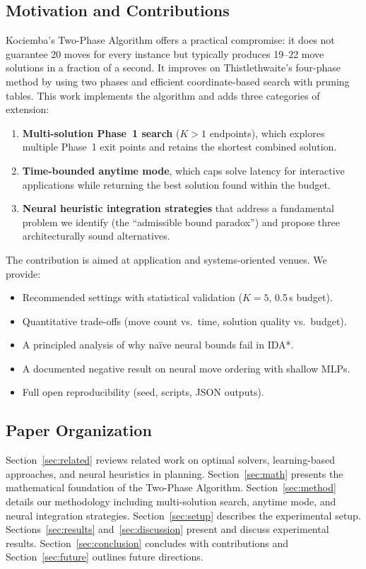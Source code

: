 \documentclass[10pt,twocolumn,a4paper]{article}
\begin{document}
\subsection{Motivation and Contributions}
Kociemba's Two-Phase Algorithm offers a practical compromise: it does not guarantee 20 moves for every instance but typically produces 19--22 move solutions in a fraction of a second. It improves on Thistlethwaite's four-phase method by using two phases and efficient coordinate-based search with pruning tables. This work implements the algorithm and adds three categories of extension:

\begin{enumerate}[leftmargin=*]
  \item \textbf{Multi-solution Phase~1 search} ($K > 1$ endpoints), which explores multiple Phase~1 exit points and retains the shortest combined solution.
  \item \textbf{Time-bounded anytime mode}, which caps solve latency for interactive applications while returning the best solution found within the budget.
  \item \textbf{Neural heuristic integration strategies} that address a fundamental problem we identify (the ``admissible bound paradox'') and propose three architecturally sound alternatives.
\end{enumerate}

The contribution is aimed at application and systems-oriented venues. We provide:
\begin{itemize}[leftmargin=*]
  \item Recommended settings with statistical validation ($K{=}5$, 0.5\,s budget).
  \item Quantitative trade-offs (move count vs.\ time, solution quality vs.\ budget).
  \item A principled analysis of why na\"ive neural bounds fail in IDA*.
  \item A documented negative result on neural move ordering with shallow MLPs.
  \item Full open reproducibility (seed, scripts, JSON outputs).
\end{itemize}

\subsection{Paper Organization}
Section~\ref{sec:related} reviews related work on optimal solvers, learning-based approaches, and neural heuristics in planning. Section~\ref{sec:math} presents the mathematical foundation of the Two-Phase Algorithm. Section~\ref{sec:method} details our methodology including multi-solution search, anytime mode, and neural integration strategies. Section~\ref{sec:setup} describes the experimental setup. Sections~\ref{sec:results} and~\ref{sec:discussion} present and discuss experimental results. Section~\ref{sec:conclusion} concludes with contributions and Section~\ref{sec:future} outlines future directions.
\end{document}
